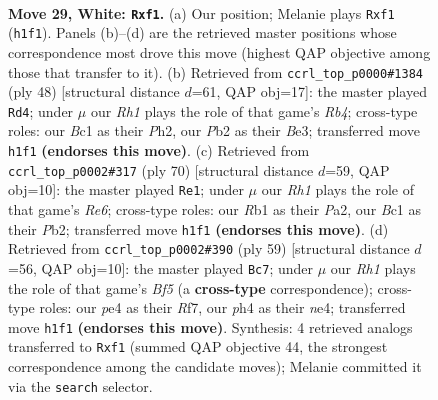 \documentclass[11pt]{article}
\begin{document}
\clearpage

\begin{figure}[p]\centering
\begin{subfigure}{0.46\textwidth}\centering
\resizebox{\linewidth}{!}{%
\newchessgame
\chessboard[
  setfen={r3k1r1/5p2/5n2/8/p2pp2p/7P/PP3P2/1RBK1b1R w q - 0 29},
  showmover=false,
  pgfstyle=straightmove, color=movearrow, markmove={h1-f1}
]}
\caption{}
\end{subfigure}\hfill
\begin{subfigure}{0.46\textwidth}\centering
\resizebox{\linewidth}{!}{%
\newchessgame
\chessboard[
  setfen={2r1k3/4p2p/5np1/1p3r2/1R6/P3B3/R1P1KPPP/8 w - - 5 25},
  showmover=false,
  pgfstyle=straightmove, color=movearrow, markmove={b4-d4}
]}
\caption{}
\end{subfigure}
\\[4pt]
\begin{subfigure}{0.46\textwidth}\centering
\resizebox{\linewidth}{!}{%
\newchessgame
\chessboard[
  setfen={5k2/p2n4/1ppPRr1p/3p2p1/6P1/2P3BP/PP4K1/8 w - - 2 36},
  showmover=false,
  pgfstyle=straightmove, color=movearrow, markmove={e6-e1}
]}
\caption{}
\end{subfigure}\hfill
\begin{subfigure}{0.46\textwidth}\centering
\resizebox{\linewidth}{!}{%
\newchessgame
\chessboard[
  setfen={8/p4r1k/1pp4p/8/2P1Nb2/2P2P1p/P2P4/6RK b - - 0 30},
  showmover=false,
  pgfstyle=straightmove, color=movearrow, markmove={f4-c7}
]}
\caption{}
\end{subfigure}
\caption{\textbf{Move 29, White: \texttt{Rxf1}.} (a) Our position; Melanie plays \texttt{Rxf1} (\texttt{h1f1}). Panels (b)--(d) are the retrieved master positions whose correspondence most drove this move (highest QAP objective among those that transfer to it). (b) Retrieved from \texttt{ccrl\_top\_p0000\#1384} (ply 48) [structural distance $d$=61, QAP obj=17]: the master played \texttt{Rd4}; under $\mu$ our \emph{Rh1} plays the role of that game's \emph{Rb4}; cross-type roles: our \emph{B}c1 as their \emph{P}h2, our \emph{P}b2 as their \emph{B}e3; transferred move \texttt{h1f1} \textbf{(endorses this move)}. (c) Retrieved from \texttt{ccrl\_top\_p0002\#317} (ply 70) [structural distance $d$=59, QAP obj=10]: the master played \texttt{Re1}; under $\mu$ our \emph{Rh1} plays the role of that game's \emph{Re6}; cross-type roles: our \emph{R}b1 as their \emph{P}a2, our \emph{B}c1 as their \emph{P}b2; transferred move \texttt{h1f1} \textbf{(endorses this move)}. (d) Retrieved from \texttt{ccrl\_top\_p0002\#390} (ply 59) [structural distance $d$=56, QAP obj=10]: the master played \texttt{Bc7}; under $\mu$ our \emph{Rh1} plays the role of that game's \emph{Bf5} (a \textbf{cross-type} correspondence); cross-type roles: our \emph{p}e4 as their \emph{R}f7, our \emph{p}h4 as their \emph{n}e4; transferred move \texttt{h1f1} \textbf{(endorses this move)}. Synthesis: 4 retrieved analogs transferred to \texttt{Rxf1} (summed QAP objective 44, the strongest correspondence among the candidate moves); Melanie committed it via the \texttt{search} selector.}
\label{fig:thought-m56}
\end{figure}
\end{document}
